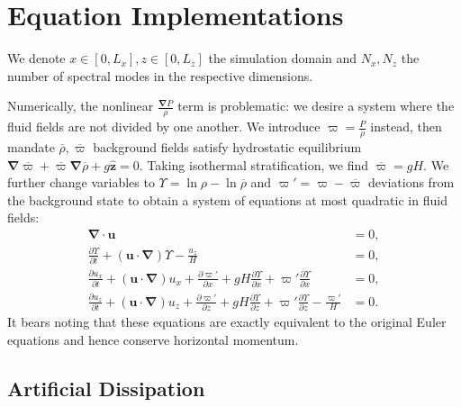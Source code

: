\documentclass[
        fleqn,
        usenatbib,
        referee,
    ]{mnras}
\newcommand*{\pd}[2]{\frac{\partial#1}{\partial#2}}
\newcommand*{\p}[1]{\left(#1\right)}
\newcommand*{\bm}[1]{\mathbf{#1}}
\newcommand*{\uv}[1]{\hat{\mathbf{#1}}}
\begin{document}
\section{Equation Implementations}\label{se:strat_impl}

We denote $x \in [0, L_x], z \in [0, L_z]$ the simulation domain and $N_x, N_z$
the number of spectral modes in the respective dimensions.

Numerically, the nonlinear $\frac{\bm{\nabla}P}{\rho}$ term is problematic: we
desire a system where the fluid fields are not divided by one another. We
introduce $\varpi = \frac{P}{\rho}$ instead, then mandate $\overline{\rho},
\overline{\varpi}$ background fields satisfy hydrostatic equilibrium
$\bm{\nabla}\overline{\varpi} + \overline{\varpi} \bm{\nabla}\overline{\rho} +
g\uv{z} = 0$. Taking isothermal stratification, we find $\overline{\varpi} = gH$. We
further change variables to $\Upsilon = \ln \rho - \ln \overline{\rho}$ and
$\varpi' = \varpi - \overline{\varpi}$ deviations from the background state to
obtain a system of equations at most quadratic in fluid fields:
\begin{subequations}\label{se:nl_var}
    \begin{align}
        \bm{\nabla} \cdot \bm{u} &= 0,\\
        \pd{\Upsilon}{t} + \p{\bm{u} \cdot \bm{\nabla}} \Upsilon
            - \frac{u_z}{H} &= 0,\\
        \pd{u_{x}}{t} + \p{\bm{u} \cdot \bm{\nabla}}u_{x}
            + \pd{\varpi'}{x} + gH\pd{\Upsilon}{x}
            + \varpi' \pd{\Upsilon}{x} &= 0,\\
        \pd{u_z}{t} + \p{\bm{u} \cdot \bm{\nabla}}u_z
            + \pd{\varpi'}{z} + gH\pd{\Upsilon}{z}
            + \varpi' \pd{\Upsilon}{z} - \frac{\varpi'}{H} &= 0.
    \end{align}
\end{subequations}
It bears noting that these equations are exactly equivalent to the original
Euler equations and hence conserve horizontal momentum.

\subsection{Artificial Dissipation}
\end{document}
